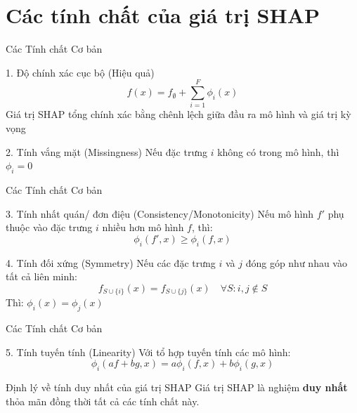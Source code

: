 \documentclass[notheorems, aspectratio=149]{beamer}
\begin{document}
\section{Các tính chất của giá trị SHAP}

\begin{frame}{Các Tính chất Cơ bản}
\begin{block}{1. Độ chính xác cục bộ (Hiệu quả)}
\begin{equation}
f(x) = f_\emptyset + \sum_{i=1}^{F} \phi_i(x)
\end{equation}
Giá trị SHAP tổng chính xác bằng chênh lệch giữa đầu ra mô hình và giá trị kỳ vọng
\end{block}

\begin{block}{2. Tính vắng mặt (Missingness)}
Nếu đặc trưng $i$ không có trong mô hình, thì $\phi_i = 0$
\end{block}
\end{frame}

\begin{frame}{Các Tính chất Cơ bản}
\begin{block}{3. Tính nhất quán/ đơn điệu (Consistency/Monotonicity)}
Nếu mô hình $f'$ phụ thuộc vào đặc trưng $i$ nhiều hơn mô hình $f$, thì:
\begin{equation}
\phi_i(f', x) \geq \phi_i(f, x)
\end{equation}
\end{block}

\begin{block}{4. Tính đối xứng (Symmetry)}
Nếu các đặc trưng $i$ và $j$ đóng góp như nhau vào tất cả liên minh:
\begin{equation}
f_{S \cup \{i\}}(x) = f_{S \cup \{j\}}(x) \quad \forall S : i,j \notin S
\end{equation}
Thì: $\phi_i(x) = \phi_j(x)$
\end{block}
\end{frame}

\begin{frame}{Các Tính chất Cơ bản}
\begin{block}{5. Tính tuyến tính (Linearity)}
Với tổ hợp tuyến tính các mô hình:
\begin{equation}
\phi_i(af + bg, x) = a\phi_i(f, x) + b\phi_i(g, x)
\end{equation}
\end{block}

\begin{alertblock}{Định lý về tính duy nhất của giá trị SHAP}
Giá trị SHAP là nghiệm \textbf{duy nhất} thỏa mãn đồng thời tất cả các tính chất này.
\end{alertblock}
\end{frame}
\end{document}
